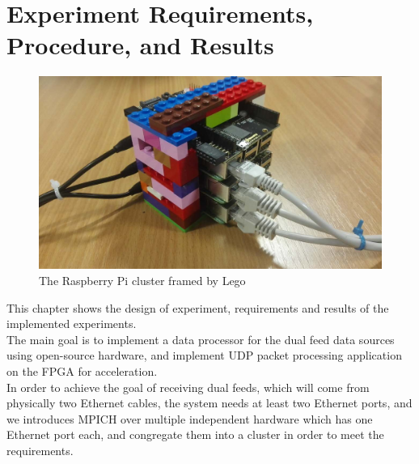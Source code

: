 \documentclass[11pt,openright,a4paper]{report}
\begin{document}
\chapter{Experiment Requirements, Procedure, and Results}
\begin{figure}[H]
	\centering
	\includegraphics[width=0.7\linewidth]{picture/photo/cluster}
	\caption{The Raspberry Pi cluster framed by Lego}
	\label{fig:cluster}
\end{figure}
This chapter shows the design of experiment, requirements and results of the implemented experiments.\\
The main goal is to implement a data processor for the dual feed data sources using open-source hardware, and implement UDP packet processing application on the FPGA for acceleration.\\
In order to achieve the goal of receiving dual feeds, which will come from physically two Ethernet cables, the system needs at least two Ethernet ports, and we introduces MPICH over multiple independent hardware which has one Ethernet port each, and congregate them into a cluster in order to meet the requirements.\\
\newpage
\end{document}
